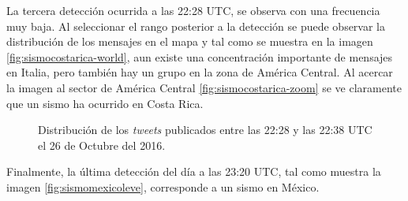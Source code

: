 	La tercera detección ocurrida a las 22:28 UTC, se observa con una frecuencia muy baja. Al seleccionar el rango posterior a la detección se puede observar la distribución de los mensajes en el mapa y tal como se muestra en la imagen \ref{fig:sismocostarica-world}, aun existe una concentración importante de mensajes en Italia, pero también hay un grupo en la zona de América Central. Al acercar la imagen al sector de América Central \ref{fig:sismocostarica-zoom} se ve claramente que un sismo ha ocurrido en Costa Rica. 
	
	
	\begin{figure}[ht]
	\centering
	\hfill
  	\caption{Distribución de los \textit{tweets} publicados entre las 22:28 y las 22:38 UTC el 26 de Octubre del 2016.}
  	\label{fig:sismocostarica}
  	\end{figure}
	
	Finalmente, la última detección del día a las 23:20 UTC, tal como muestra la imagen \ref{fig:sismomexicoleve}, corresponde a un sismo en México. 
	
